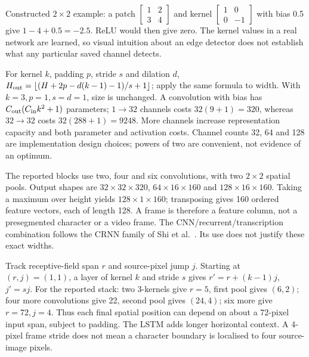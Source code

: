 Constructed $2\times2$ example: a patch
$\left[\begin{smallmatrix}1&2\\3&4\end{smallmatrix}\right]$ and kernel
$\left[\begin{smallmatrix}1&0\\0&-1\end{smallmatrix}\right]$ with bias 0.5
give $1-4+0.5=-2.5$. ReLU would then give zero. The kernel values in a
real network are learned, so visual intuition about an edge detector does
not establish what any particular saved channel detects.

For kernel $k$, padding $p$, stride $s$ and dilation $d$,
$H_{\rm out}=\lfloor(H+2p-d(k-1)-1)/s+1\rfloor$; apply the same formula
to width. With $k=3,p=1,s=d=1$, size is unchanged. A convolution with bias
has $C_{\rm out}(C_{\rm in}k^2+1)$ parameters; $1\to32$ channels costs
$32(9+1)=320$, whereas $32\to32$ costs $32(288+1)=9248$.
More channels increase representation capacity and both parameter and
activation costs. Channel counts 32, 64 and 128 are implementation design
choices; powers of two are convenient, not evidence of an optimum.

The reported blocks use two, four and six convolutions, with two $2\times2$
spatial pools. Output shapes are $32\times32\times320$,
$64\times16\times160$ and $128\times16\times160$.
Taking a maximum over height yields $128\times1\times160$; transposing
gives 160 ordered feature vectors, each of length 128. A frame is therefore
a feature column, not a presegmented character or a video frame.
The CNN/recurrent/transcription combination follows the CRNN family
of Shi et al.~\cite{shi2017}. Its use does not justify these exact widths.

Track receptive-field span $r$ and source-pixel jump $j$. Starting at
$(r,j)=(1,1)$, a layer of kernel $k$ and stride $s$ gives
$r'=r+(k-1)j$, $j'=sj$. For the reported stack: two $3$-kernels give
$r=5$, first pool gives $(6,2)$; four more convolutions give 22, second
pool gives $(24,4)$; six more give $r=72,j=4$. Thus each final spatial
position can depend on about a $72$-pixel input span, subject to padding.
The LSTM adds longer horizontal context. A 4-pixel frame stride does not
mean a character boundary is localised to four source-image pixels.


